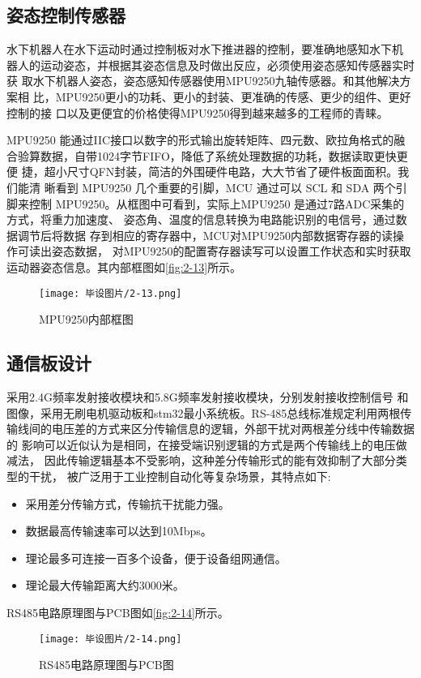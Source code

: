 \subsection{姿态控制传感器}
水下机器人在水下运动时通过控制板对水下推进器的控制，要准确地感知水下机
器人的运动姿态，并根据其姿态信息及时做出反应，必须使用姿态感知传感器实时获
取水下机器人姿态，姿态感知传感器使用MPU9250九轴传感器。和其他解决方案相
比，MPU9250更小的功耗、更小的封装、更准确的传感、更少的组件、更好控制的接
口以及更便宜的价格使得MPU9250得到越来越多的工程师的青睐。

MPU9250 能通过IIC接口以数字的形式输出旋转矩阵、四元数、欧拉角格式的融
合验算数据，自带1024字节FIFO，降低了系统处理数据的功耗，数据读取更快更便
捷，超小尺寸QFN封装，简洁的外围硬件电路，大大节省了硬件板面面积。我们能清
晰看到 MPU9250 几个重要的引脚，MCU 通过可以 SCL 和 SDA 两个引脚来控制
MPU9250。从框图中可看到，实际上MPU9250 是通过7路ADC采集的方式，将重力加速度、
姿态角、温度的信息转换为电路能识别的电信号，通过数据调节后将数据
存到相应的寄存器中，MCU对MPU9250内部数据寄存器的读操作可读出姿态数据，
对MPU9250的配置寄存器读写可以设置工作状态和实时获取运动器姿态信息。其内部框图如\autoref{fig:2-13}所示。
\begin{figure}[htbp]
    \centering
    \texttt{[image: 毕设图片/2-13.png]}
    \caption{\label{fig:2-13} MPU9250内部框图}
\end{figure}

\subsection{通信板设计}

采用2.4G频率发射接收模块和5.8G频率发射接收模块，分别发射接收控制信号
和图像，采用无刷电机驱动板和stm32最小系统板。RS-485总线标准规定利用两根传
输线间的电压差的方式来区分传输信息的逻辑，外部干扰对两根差分线中传输数据的
影响可以近似认为是相同，在接受端识别逻辑的方式是两个传输线上的电压做减法，
因此传输逻辑基本不受影响，这种差分传输形式的能有效抑制了大部分类型的干扰，
被广泛用于工业控制自动化等复杂场景，其特点如下:  
\begin{itemize}
    \item 采用差分传输方式，传输抗干扰能力强。
    \item 数据最高传输速率可以达到10Mbps。 
    \item 理论最多可连接一百多个设备，便于设备组网通信。
    \item 理论最大传输距离大约3000米。
\end{itemize}
RS485电路原理图与PCB图如\autoref{fig:2-14}所示。
\begin{figure}[htbp]
    \centering
    \texttt{[image: 毕设图片/2-14.png]}
    \caption{\label{fig:2-14} RS485电路原理图与PCB图}
\end{figure}

